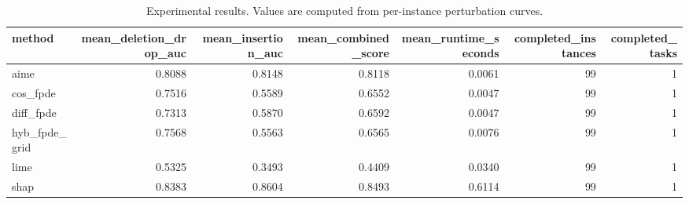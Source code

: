 \begin{table}[t]
\caption{Experimental results. Values are computed from per-instance perturbation curves.}
\label{tab:main_results_computed}
\centering
\begin{tabular}{lrrrrrr}
\toprule
method & mean\_deletion\_drop\_auc & mean\_insertion\_auc & mean\_combined\_score & mean\_runtime\_seconds & completed\_instances & completed\_tasks \\
\midrule
aime & 0.8088 & 0.8148 & 0.8118 & 0.0061 & 99 & 1 \\
cos\_fpde & 0.7516 & 0.5589 & 0.6552 & 0.0047 & 99 & 1 \\
diff\_fpde & 0.7313 & 0.5870 & 0.6592 & 0.0047 & 99 & 1 \\
hyb\_fpde\_grid & 0.7568 & 0.5563 & 0.6565 & 0.0076 & 99 & 1 \\
lime & 0.5325 & 0.3493 & 0.4409 & 0.0340 & 99 & 1 \\
shap & 0.8383 & 0.8604 & 0.8493 & 0.6114 & 99 & 1 \\
\bottomrule
\end{tabular}

\end{table}
